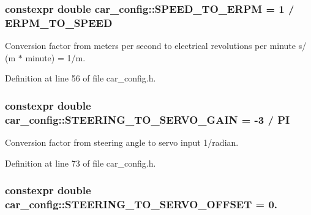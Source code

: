 \subsubsection[{\texorpdfstring{S\+P\+E\+E\+D\+\_\+\+T\+O\+\_\+\+E\+R\+PM}{SPEED_TO_ERPM}}]{\setlength{\rightskip}{0pt plus 5cm}constexpr double car\+\_\+config\+::\+S\+P\+E\+E\+D\+\_\+\+T\+O\+\_\+\+E\+R\+PM = 1 / {\bf E\+R\+P\+M\+\_\+\+T\+O\+\_\+\+S\+P\+E\+ED}}\hypertarget{namespacecar__config_a0f37aa7e52366aebb006c6e1d3317900}{}\label{namespacecar__config_a0f37aa7e52366aebb006c6e1d3317900}


Conversion factor from meters per second to electrical revolutions per minute  s/ (m $\ast$ minute) = 1/m. 



Definition at line 56 of file car\+\_\+config.\+h.

\subsubsection[{\texorpdfstring{S\+T\+E\+E\+R\+I\+N\+G\+\_\+\+T\+O\+\_\+\+S\+E\+R\+V\+O\+\_\+\+G\+A\+IN}{STEERING_TO_SERVO_GAIN}}]{\setlength{\rightskip}{0pt plus 5cm}constexpr double car\+\_\+config\+::\+S\+T\+E\+E\+R\+I\+N\+G\+\_\+\+T\+O\+\_\+\+S\+E\+R\+V\+O\+\_\+\+G\+A\+IN = -\/3 / {\bf PI}}\hypertarget{namespacecar__config_aa8ab85fe7b8ab728f34d15028f114d86}{}\label{namespacecar__config_aa8ab85fe7b8ab728f34d15028f114d86}


Conversion factor from steering angle to servo input  1/radian. 



Definition at line 73 of file car\+\_\+config.\+h.

\subsubsection[{\texorpdfstring{S\+T\+E\+E\+R\+I\+N\+G\+\_\+\+T\+O\+\_\+\+S\+E\+R\+V\+O\+\_\+\+O\+F\+F\+S\+ET}{STEERING_TO_SERVO_OFFSET}}]{\setlength{\rightskip}{0pt plus 5cm}constexpr double car\+\_\+config\+::\+S\+T\+E\+E\+R\+I\+N\+G\+\_\+\+T\+O\+\_\+\+S\+E\+R\+V\+O\+\_\+\+O\+F\+F\+S\+ET = 0.}\hypertarget{namespacecar__config_abb6ef746663276219b321683dfbb8896}{}\label{namespacecar__config_abb6ef746663276219b321683dfbb8896}


